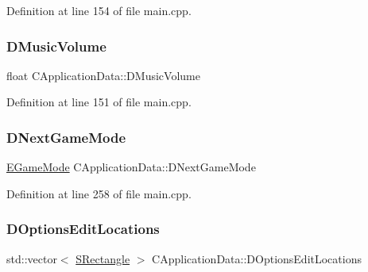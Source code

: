 Definition at line 154 of file main.\+cpp.

\hypertarget{classCApplicationData_a8bc61af4a83a667102e55cca2a739c3b}{}\label{classCApplicationData_a8bc61af4a83a667102e55cca2a739c3b} 
\subsubsection{\texorpdfstring{D\+Music\+Volume}{DMusicVolume}}
{\footnotesize\ttfamily float C\+Application\+Data\+::\+D\+Music\+Volume\hspace{0.3cm}{\ttfamily [protected]}}



Definition at line 151 of file main.\+cpp.

\hypertarget{classCApplicationData_a3b67edeacd70201dcf96fa9fa8aa2107}{}\label{classCApplicationData_a3b67edeacd70201dcf96fa9fa8aa2107} 
\subsubsection{\texorpdfstring{D\+Next\+Game\+Mode}{DNextGameMode}}
{\footnotesize\ttfamily \hyperlink{classCApplicationData_ac8ac37a4c8bb871036fbbdc6a072e403}{E\+Game\+Mode} C\+Application\+Data\+::\+D\+Next\+Game\+Mode\hspace{0.3cm}{\ttfamily [protected]}}



Definition at line 258 of file main.\+cpp.

\hypertarget{classCApplicationData_ab4e6804c6e50cca45ab3c3071588da34}{}\label{classCApplicationData_ab4e6804c6e50cca45ab3c3071588da34} 
\subsubsection{\texorpdfstring{D\+Options\+Edit\+Locations}{DOptionsEditLocations}}
{\footnotesize\ttfamily std\+::vector$<$ \hyperlink{structSRectangle}{S\+Rectangle} $>$ C\+Application\+Data\+::\+D\+Options\+Edit\+Locations\hspace{0.3cm}{\ttfamily [protected]}}



